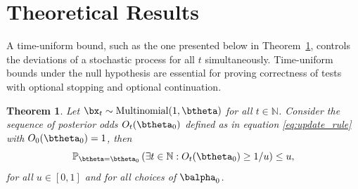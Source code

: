 \documentclass[11pt]{article}
\newtheorem{thm}{Theorem}[section]
\begin{document}
\section{Theoretical Results}
\label{sec:theory}
A time-uniform bound, such as the one presented below in Theorem~\ref{thm:type_1_error}, controls the deviations of a stochastic process for all $t$ simultaneously.
Time-uniform bounds under the null hypothesis are essential for proving correctness of tests with optional stopping and optional continuation.
\begin{thm}  
  \label{thm:type_1_error}
  Let $\bx_t\sim \mathrm{Multinomial}(1,\btheta)$ for all $t \in \mathbb{N}$.
Consider the sequence of posterior odds $O_t(\btheta_0)$ defined as in equation \eqref{eq:update_rule} with $O_0(\btheta_0)=1$, then
\begin{equation}
  \label{eq:type_1_error}
  \mathbb{P}_{\btheta = \btheta_0}\left( \exists t \in \mathbb{N}: O_t(\btheta_0) \geq 1/u \right) \leq u,
\end{equation}
for all $u \in [0,1]$ and for all choices of $\balpha_0$.
\end{thm}
\end{document}
